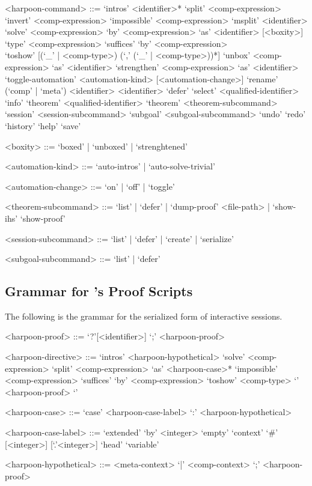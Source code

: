 \begin{grammar}
<harpoon-command> ::= `intros' <identifier>*
\alt `split' <comp-expression>
\alt `invert' <comp-expression>
\alt `impossible' <comp-expression>
\alt `msplit' <identifier>
\alt `solve' <comp-expression>
\alt `by' <comp-expression> `as' <identifier> [<boxity>]
\alt `type' <comp-expression>
\alt `suffices' `by' <comp-expression>\\
`toshow' [(`_' | <comp-type>) (`,' (`_' | <comp-type>))*]
\alt `unbox' <comp-expression> `as' <identifier>
\alt `strengthen' <comp-expression> `as' <identifier>
\alt `toggle-automation' <automation-kind> [<automation-change>]
\alt `rename' (`comp' | `meta') <identifier> <identifier>
\alt `defer'
\alt `select' <qualified-identifier>
\alt `info' `theorem' <qualified-identifier>
\alt `theorem' <theorem-subcommand>
\alt `session' <session-subcommand>
\alt `subgoal' <subgoal-subcommand>
\alt `undo'
\alt `redo'
\alt `history'
\alt `help'
\alt `save'

<boxity> ::= `boxed' | `unboxed' | `strenghtened'

<automation-kind> ::= `auto-intros' | `auto-solve-trivial'

<automation-change> ::= `on' | `off' | `toggle'

<theorem-subcommand> ::= `list' | `defer' | `dump-proof' <file-path> | `show-ihs' \alt `show-proof'

<session-subcommand> ::= `list' | `defer' | `create' | `serialize'

<subgoal-subcommand> ::= `list' | `defer'
\end{grammar}

\subsection{Grammar for \Harpoon's Proof Scripts}\label{section:syntax-harpoon-proof-scripts}

The following is the grammar for the serialized form of \Harpoon interactive sessions.

\begin{grammar}
<harpoon-proof> ::= `?'[<identifier>]
 `;' <harpoon-proof>

<harpoon-directive> ::= `intros' <harpoon-hypothetical>
\alt `solve' <comp-expression>
\alt `split' <comp-expression> `as' <harpoon-case>*
\alt `impossible' <comp-expression>
\alt `suffices' `by' <comp-expression> `toshow' <comp-type> `{' <harpoon-proof> `}'

<harpoon-case> ::= `case' <harpoon-case-label> `:' <harpoon-hypothetical>

<harpoon-case-label> ::= `extended' `by' <integer>
\alt `empty' `context'
\alt `#' [<integer>] [`.'<integer>]
\alt `head' `variable'

<harpoon-hypothetical> ::= <meta-context> `|' <comp-context> `;' <harpoon-proof>
\end{grammar}


